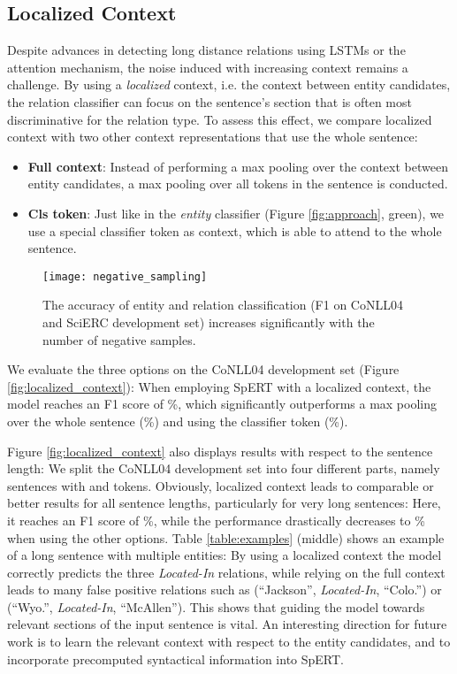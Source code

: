 \documentclass{ecai}
\begin{document}
\subsection{Localized Context}

Despite advances in detecting long distance relations using LSTMs or the attention mechanism, the noise induced with increasing context remains a challenge. By using a {\it localized} context, i.e. the context between entity candidates, the relation classifier can focus on the sentence's section that is often most discriminative for the relation type. To assess this effect, we compare localized context with two other context representations that use the whole sentence:

\begin{itemize}
    \item \textbf{Full context}: Instead of performing a max pooling over the context between entity candidates, a max pooling over all tokens in the sentence is conducted.
    \item \textbf{Cls token}: Just like in the {\it entity} classifier (Figure \ref{fig:approach}, green), we use a special classifier token as context, which is able to attend to the whole sentence. \end{itemize}

\begin{figure}[ht!]
    \centering
    \texttt{[image: negative\_sampling]}
    \caption{The accuracy of entity and relation classification (F1 on CoNLL04 and SciERC development set) increases significantly with the number of negative samples.}
    \label{fig:neg_sampling}
\end{figure}


We evaluate the three options on the CoNLL04 development set (Figure \ref{fig:localized_context}): When employing SpERT with a localized context, the model reaches an F1 score of \%, which significantly outperforms a max pooling over the whole sentence (\%) and using the classifier token (\%).

Figure \ref{fig:localized_context} also displays results with respect to the sentence length: We split the CoNLL04 development set into four different parts, namely sentences with  and  tokens. Obviously, localized context leads to comparable or better results for all sentence lengths, particularly for very long sentences: Here, it reaches an F1 score of \%, while the performance drastically decreases to \% when using the other options. Table \ref{table:examples} (middle) shows an example of a long sentence with multiple entities: By using a localized context the model correctly predicts the three \emph{Located-In} relations, while relying on the full context leads to many false positive relations such as (\enquote{Jackson}, \emph{Located-In}, \enquote{Colo.}) or (\enquote{Wyo.}, \emph{Located-In}, \enquote{McAllen}).
This shows that guiding the model towards relevant sections of the input sentence is vital. An interesting direction for future work is to learn the relevant context with respect to the entity candidates, and to incorporate precomputed syntactical information into SpERT.
\end{document}
